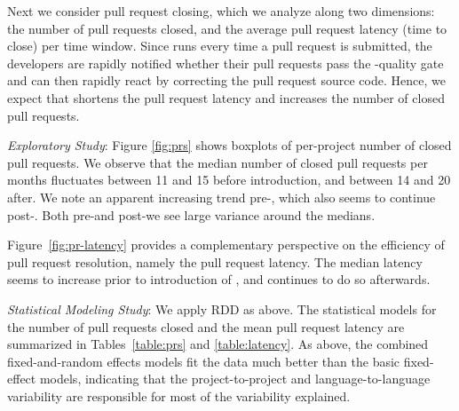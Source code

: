 

Next we consider pull request closing, which we analyze along two 
dimensions: the number of pull requests closed, and the average
pull request latency (\ie time to close) per time window.
Since \Tvis  runs every time a pull request is submitted, 
the developers are rapidly notified whether their pull requests pass the 
\Tvi-quality gate and can then rapidly react %
by correcting the pull request source code.
Hence, we expect that \Tvis shortens the pull request latency and
increases the number of closed pull requests.

\smallskip\noindent \emph{Exploratory Study}:
Figure
\ref{fig:prs} shows boxplots of per-project number of closed pull requests.
We observe that the median number of closed pull requests 
per months fluctuates between 11 and 15 before \Tvi introduction, and 
between 14 and 20 after.
We note an apparent increasing trend pre-\Tvi, which also seems to continue post-\Tvi.
Both pre-\Tvi and post-\Tvi we see large variance around the 
medians. 

Figure~\ref{fig:pr-latency} provides a complementary perspective on the efficiency 
of pull request resolution, namely the pull request latency.
The median latency seems to increase prior to introduction of \Tvis, and continues
to do so afterwards. %

\smallskip\noindent \emph{Statistical Modeling Study}:
We apply RDD as above. 
The statistical models for the number of pull requests closed and the mean pull 
request latency are summarized in Tables~\ref{table:prs} and \ref{table:latency}.
As above, the combined fixed-and-random effects models fit the data much 
better than the basic fixed-effect models, indicating that the project-to-project 
and language-to-language variability are responsible for most of the variability 
explained.

